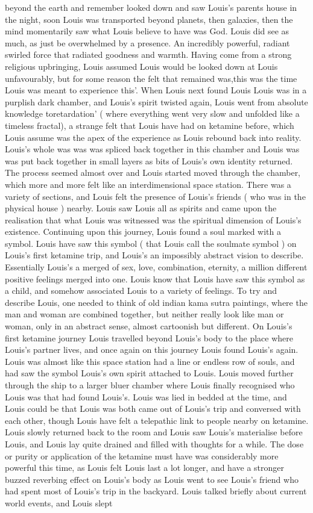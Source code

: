 \documentclass[12pt]{book}
\begin{document}
beyond the earth and remember looked down and saw Louis's parents house in the night, soon Louis was transported beyond planets, then galaxies, then the mind momentarily saw what Louis believe to have was God. Louis did see as much, as just be overwhelmed by a presence. An incredibly powerful, radiant swirled force that radiated goodness and warmth. Having come from a strong religious upbringing, Louis assumed Louis would be looked down at Louis unfavourably, but for some reason the felt that remained was,this was the time Louis was meant to experience this'. When Louis next found Louis Louis was in a purplish dark chamber, and Louis's spirit twisted again, Louis went from absolute knowledge toretardation' ( where everything went very slow and unfolded like a timeless fractal), a strange felt that Louis have had on ketamine before, which Louis assume was the apex of the experience as Louis rebound back into reality. Louis's whole was was was spliced back together in this chamber and Louis was was put back together in small layers as bits of Louis's own identity returned. The process seemed almost over and Louis started moved through the chamber, which more and more felt like an interdimensional space station. There was a variety of sections, and Louis felt the presence of Louis's friends ( who was in the physical house ) nearby. Louis saw Louis all as spirits and came upon the realisation that what Louis was witnessed was the spiritual dimension of Louis's existence. Continuing upon this journey, Louis found a soul marked with a symbol. Louis have saw this symbol ( that Louis call the soulmate symbol ) on Louis's first ketamine trip, and Louis's an impossibly abstract vision to describe. Essentially Louis's a merged of sex, love, combination, eternity, a million different positive feelings merged into one. Louis know that Louis have saw this symbol as a child, and somehow associated Louis to a variety of feelings. To try and describe Louis, one needed to think of old indian kama sutra paintings, where the man and woman are combined together, but neither really look like man or woman, only in an abstract sense, almost cartoonish but different. On Louis's first ketamine journey Louis travelled beyond Louis's body to the place where Louis's partner lives, and once again on this journey Louis found Louis's again. Louis was almost like this space station had a line or endless row of souls, and had saw the symbol Louis's own spirit attached to Louis. Louis moved further through the ship to a larger bluer chamber where Louis finally recognised who Louis was that had found Louis's. Louis was lied in bedded at the time, and Louis could be that Louis was both came out of Louis's trip and conversed with each other, though Louis have felt a telepathic link to people nearby on ketamine. Louis slowly returned back to the room and Louis saw Louis's materialise before Louis, and Louis lay quite drained and filled with thoughts for a while. The dose or purity or application of the ketamine must have was considerably more powerful this time, as Louis felt Louis last a lot longer, and have a stronger buzzed reverbing effect on Louis's body as Louis went to see Louis's friend who had spent most of Louis's trip in the backyard. Louis talked briefly about current world events, and Louis slept 
\end{document}
